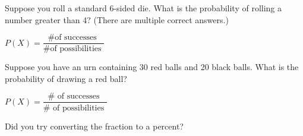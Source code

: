 \documentclass{ximera}
\begin{document}
\begin{question}
Suppose you roll a standard 6-sided die. What is the probability of rolling a number greater than 4? (There are multiple correct answers.)

    \begin{multipleChoice}
      \end{multipleChoice}
    \begin{hint}
    $P(X) = \dfrac{ \text{\# of successes }}{ \text{\# of possibilities } }$
    \end{hint}
\end{question}

\begin{question}
Suppose you have an urn containing 30 red balls and 20 black balls. What is the probability of drawing a red ball?

    \begin{multipleChoice}
      \end{multipleChoice}
    \begin{hint}
    $P(X) = \dfrac{ \#\text{ of successes }}{ \#\text{ of possibilities } }$
    \end{hint}
    \begin{hint}
    Did you try converting the fraction to a percent?
    \end{hint}

\end{question}
\end{document}
